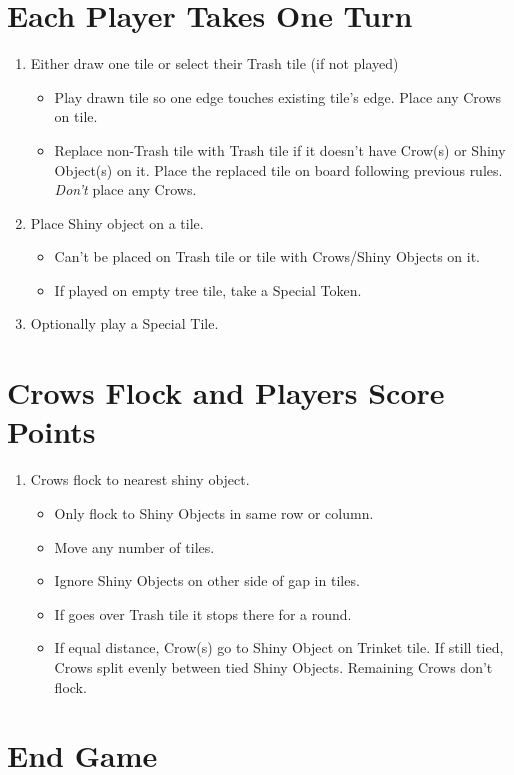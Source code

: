 \documentclass[12pt]{article}
\newenvironment{enumerateCustom}
{\begin{enumerate}
  \setlength{\itemsep}{1pt}
  \setlength{\parskip}{0pt}
  \setlength{\parsep}{0pt}}
{\end{enumerate}}
\newenvironment{itemizeCustom}
{\begin{itemize}
  \setlength{\itemsep}{1pt}
  \setlength{\parskip}{0pt}
  \setlength{\parsep}{0pt}}
{\end{itemize}}
\begin{document}
\begin{mdframed}[style = customFrame]
\begin{multicols*}{2}
\section*{Each Player Takes One Turn}
\begin{enumerateCustom}
	\item Either draw one tile or select their Trash tile (if not played)
		\begin{itemizeCustom}
			\item Play drawn tile so one edge touches existing tile's edge. Place any Crows on tile.
			\item Replace non-Trash tile with Trash tile if it doesn't have Crow(s) or Shiny Object(s) on it. Place the replaced tile on board following previous rules. \emph{Don't} place any Crows.
		\end{itemizeCustom}
	\item Place Shiny object on a tile.
		\begin{itemizeCustom}
			\item Can't be placed on Trash tile or tile with Crows/Shiny Objects on it.
			\item If played on empty tree tile, take a Special Token.
		\end{itemizeCustom}
	\item Optionally play a Special Tile.
\end{enumerateCustom}

\section*{Crows Flock and Players Score Points}
\begin{enumerateCustom}
	\item Crows flock to nearest shiny object.
		\begin{itemizeCustom}
			\item Only flock to Shiny Objects in same row or column.
			\item Move any number of tiles.
			\item Ignore Shiny Objects on other side of gap in tiles.
			\item If goes over Trash tile it stops there for a round.
			\item If equal distance, Crow(s) go to Shiny Object on Trinket tile. If still tied, Crows split evenly between tied Shiny Objects. Remaining Crows don't flock.
		\end{itemizeCustom}
\end{enumerateCustom}

\section*{End Game}

\end{multicols*}
\end{mdframed}
\end{document}
